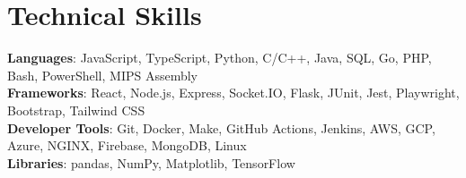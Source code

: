 \documentclass[letterpaper,11pt]{article}
\begin{document}
\section{Technical Skills}
\begin{itemize}[leftmargin=0.15in, label={}]
	\small{\item{
		      \textbf{Languages}{: JavaScript, TypeScript, Python, C/C++, Java, SQL, Go, PHP, Bash, PowerShell, MIPS Assembly} \\
		      \textbf{Frameworks}{: React, Node.js, Express, Socket.IO, Flask, JUnit, Jest, Playwright, Bootstrap, Tailwind CSS} \\
		      \textbf{Developer Tools}{: Git, Docker, Make, GitHub Actions, Jenkins, AWS, GCP, Azure, NGINX, Firebase, MongoDB, Linux} \\
		      \textbf{Libraries}{: pandas, NumPy, Matplotlib, TensorFlow}
	      }}
\end{itemize}


\end{document}
